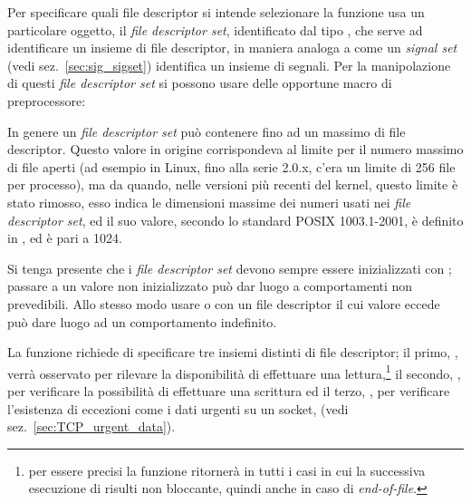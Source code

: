 
Per specificare quali file descriptor si intende selezionare la funzione usa
un particolare oggetto, il \textit{file descriptor set}, identificato dal tipo
, che serve ad identificare un insieme di file descriptor, in
maniera analoga a come un \textit{signal set} (vedi sez.~\ref{sec:sig_sigset})
identifica un insieme di segnali. Per la manipolazione di questi \textit{file
  descriptor set} si possono usare delle opportune macro di preprocessore:

{\centering
\vspace{3pt}
\begin{funcbox}{
}
\end{funcbox}}


In genere un \textit{file descriptor set} può contenere fino ad un massimo di
 file descriptor.  Questo valore in origine corrispondeva
al limite per il numero massimo di file aperti (ad esempio in Linux, fino alla
serie 2.0.x, c'era un limite di 256 file per processo), ma da quando, nelle
versioni più recenti del kernel, questo limite è stato rimosso, esso indica le
dimensioni massime dei numeri usati nei \textit{file descriptor set}, ed il
suo valore, secondo lo standard POSIX 1003.1-2001, è definito in
, ed è pari a 1024.

Si tenga presente che i \textit{file descriptor set} devono sempre essere
inizializzati con ; passare a  un valore non
inizializzato può dar luogo a comportamenti non prevedibili. Allo stesso modo
usare  o  con un file descriptor il cui valore
eccede  può dare luogo ad un comportamento indefinito.

La funzione richiede di specificare tre insiemi distinti di file descriptor;
il primo, , verrà osservato per rilevare la disponibilità di
effettuare una lettura,\footnote{per essere precisi la funzione ritornerà in
  tutti i casi in cui la successiva esecuzione di  risulti non
  bloccante, quindi anche in caso di \textit{end-of-file}.} il secondo,
, per verificare la possibilità di effettuare una scrittura ed
il terzo, , per verificare l'esistenza di eccezioni come i
dati urgenti su un socket, (vedi sez.~\ref{sec:TCP_urgent_data}).

